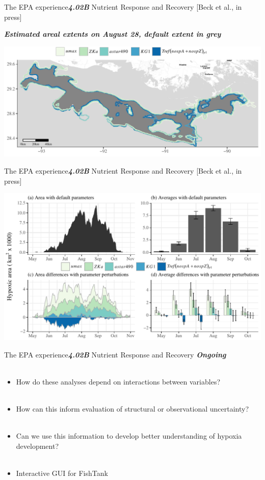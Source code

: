 \documentclass[serif]{beamer}\usepackage[]{graphicx}\usepackage[]{color}
\newcommand{\emtxt}[1]{\textbf{\textit{#1}}}
\begin{document}
\begin{frame}{The EPA experience}{\emtxt{4.02B} Nutrient Response and Recovery {\footnotesize [Beck et al., in press]}}
\centerline{\emtxt{Estimated areal extents on August 28, default extent in grey}}
\vspace{0.15in}
\centerline{\includegraphics[width=\textwidth]{fig/areachg2.pdf}}
\end{frame}

\begin{frame}{The EPA experience}{\emtxt{4.02B} Nutrient Response and Recovery {\footnotesize [Beck et al., in press]}}
\centerline{\includegraphics[width=\textwidth]{fig/areachg1.pdf}}
\end{frame}

\begin{frame}{The EPA experience}{\emtxt{4.02B} Nutrient Response and Recovery}
\emtxt{Ongoing}\\~\\
\begin{itemize}
\item How do these analyses depend on interactions between variables? \\~\\
\item How can this inform evaluation of structural or observational uncertainty? \\~\\
\item Can we use this information to develop better understanding of hypoxia development? \\~\\
\item Interactive GUI for FishTank
\end{itemize}
\end{frame}
\end{document}
